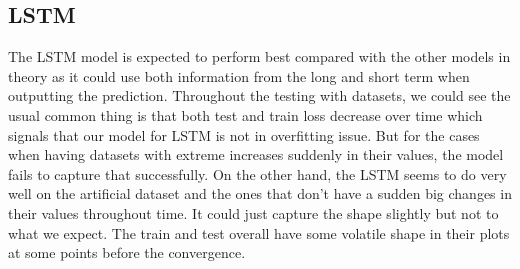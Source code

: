 \documentclass[letterpaper, 10 pt, conference]{ieeeconf}  %
\begin{document}
    \subsection{LSTM}

        The LSTM model is expected to perform best compared with the other models in theory as it could use both information from the long and short term when outputting the prediction. Throughout the testing with datasets, we could see the usual common thing is that both test and train loss decrease over time which signals that our model for LSTM is not in overfitting issue. But for the cases when having datasets with extreme increases suddenly in their values, the model fails to capture that successfully. On the other hand, the LSTM seems to do very well on the artificial dataset and the ones that don’t have a sudden big changes in their values throughout time. It could just capture the shape slightly but not to what we expect. The train and test overall have some volatile shape in their plots at some points before the convergence.
\end{document}
